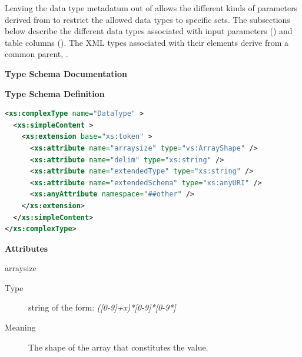 \documentclass[11pt,a4paper]{ivoa}
\begin{document}

Leaving the data type metadatum out of 
allows the different kinds of parameters derived from
 to restrict the allowed data types to
specific sets.  The subsections below describe the different data
types associated with input parameters
() and table
columns ().  The
XML types associated with their  elements
derive from a common parent, .


\begin{generated}
\begingroup
        \renewcommand*\descriptionlabel[1]{%
        \hbox to 5.5em{\emph{#1}\hfil}}\vspace{2ex}\noindent\textbf{ Type Schema Documentation}



\vspace{1ex}\noindent\textbf{ Type Schema Definition}

\begin{lstlisting}[language=XML,basicstyle=\footnotesize]
<xs:complexType name="DataType" >
  <xs:simpleContent >
    <xs:extension base="xs:token" >
      <xs:attribute name="arraysize" type="vs:ArrayShape" />
      <xs:attribute name="delim" type="xs:string" />
      <xs:attribute name="extendedType" type="xs:string" />
      <xs:attribute name="extendedSchema" type="xs:anyURI" />
      <xs:anyAttribute namespace="##other" />
    </xs:extension>
  </xs:simpleContent>
</xs:complexType>
\end{lstlisting}

\vspace{0.5ex}\noindent\textbf{ Attributes}

\begingroup\small\begin{bigdescription}
\item[arraysize]
\begin{description}
\item[Type] string of the form: \emph{([0-9]+x)*[0-9]*[0-9*]}
\item[Meaning]
                     The shape of the array that constitutes the value.


\end{description}
\end{bigdescription}
\end{generated}
\end{document}
